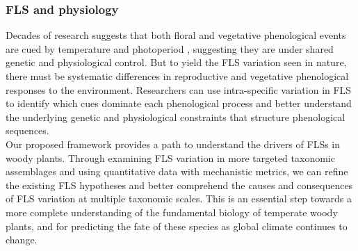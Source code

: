 \documentclass[12pt]{article}
\begin{document}
\subsubsection*{FLS and physiology} 
\indent\indent Decades of research suggests that both floral and vegetative phenological events are cued by temperature and photoperiod \citep{Forrest2010, Flynn2018}, suggesting they are under shared genetic and physiological control. But to yield the FLS variation seen in nature, there must be systematic differences in reproductive and vegetative phenological responses to the environment. Researchers can use intra-specific variation in FLS to identify which cues dominate each phenological process and better understand the underlying genetic and physiological constraints that structure phenological sequences.\\

\indent Our proposed framework provides a path to understand the drivers of FLSs in woody plants. Through examining FLS variation in more targeted taxonomic assemblages and using quantitative data with mechanistic metrics, we can refine the existing FLS hypotheses and better comprehend the causes and consequences of FLS variation at multiple taxonomic scales. This is an essential step towards a more complete understanding of the fundamental biology of temperate woody plants, and for predicting the fate of these species as global climate continues to change.
\end{document}
